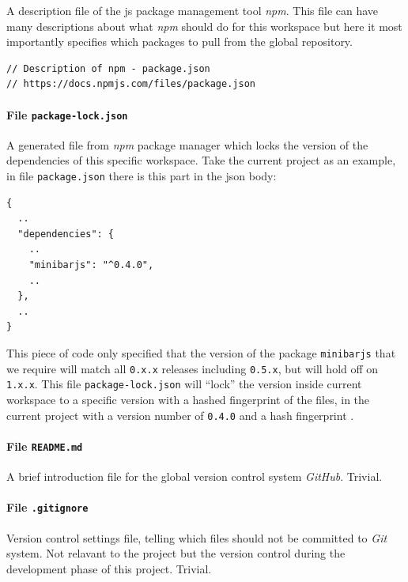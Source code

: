 A description file of the \gls{js} package management tool \emph{npm}. This file can have many descriptions about what \emph{npm} should do for this workspace but here it most importantly specifies which packages to pull from the global repository. 

\begin{verbatim}
// Description of npm - package.json
// https://docs.npmjs.com/files/package.json
\end{verbatim}

\paragraph{File \texttt{package-lock.json}}

A generated file from \emph{npm} package manager which locks the version of the dependencies of this specific workspace. Take the current project as an example, in file \texttt{package.json} there is this part in the \gls{json} body:

\begin{verbatim}
{
  ..
  "dependencies": {
    ..
    "minibarjs": "^0.4.0",
    ..
  },
  ..
}
\end{verbatim}

This piece of code only specified that the version of the package \texttt{minibarjs} that we require will match all \texttt{0.x.x} releases including \texttt{0.5.x}, but will hold off on \texttt{1.x.x}. This file \texttt{package-lock.json} will ``lock'' the version inside current workspace to a specific version with a hashed fingerprint of the files, in the current project with a version number of \texttt{0.4.0} and a hash fingerprint .

\paragraph{File \texttt{README.md}}

A brief introduction file for the global version control system \emph{GitHub}. Trivial.

\paragraph{File \texttt{.gitignore}}

Version control settings file, telling which files should not be committed to \emph{Git} system. Not relavant to the project but the version control during the development phase of this project. Trivial.

